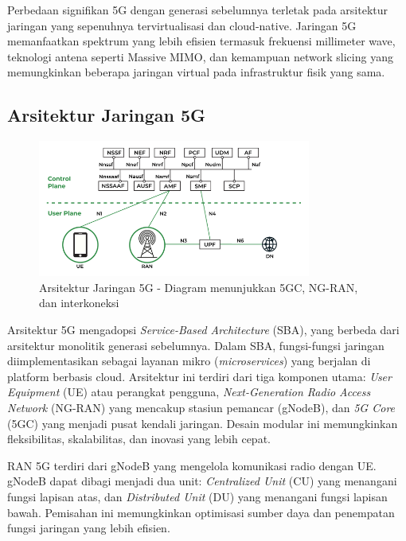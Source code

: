 Perbedaan signifikan 5G dengan generasi sebelumnya terletak pada arsitektur jaringan yang sepenuhnya tervirtualisasi dan cloud-native. Jaringan 5G memanfaatkan spektrum yang lebih efisien termasuk frekuensi millimeter wave, teknologi antena seperti Massive MIMO, dan kemampuan network slicing yang memungkinkan beberapa jaringan virtual pada infrastruktur fisik yang sama.

\subsection{Arsitektur Jaringan 5G}

\begin{figure}[htbp]
    \centering
    \includegraphics[width=0.8\textwidth]{assets/pics/bab3_7.png}
    \caption{Arsitektur Jaringan 5G - Diagram menunjukkan 5GC, NG-RAN, dan interkoneksi}
    \label{fig:5g_architecture}
\end{figure}

Arsitektur 5G mengadopsi \textit{Service-Based Architecture} (SBA), yang berbeda dari arsitektur monolitik generasi sebelumnya. Dalam SBA, fungsi-fungsi jaringan diimplementasikan sebagai layanan mikro (\textit{microservices}) yang berjalan di platform berbasis cloud. Arsitektur ini terdiri dari tiga komponen utama: \textit{User Equipment} (UE) atau perangkat pengguna, \textit{Next-Generation Radio Access Network} (NG-RAN) yang mencakup stasiun pemancar (gNodeB), dan \textit{5G Core} (5GC) yang menjadi pusat kendali jaringan. Desain modular ini memungkinkan fleksibilitas, skalabilitas, dan inovasi yang lebih cepat.

RAN 5G terdiri dari gNodeB yang mengelola komunikasi radio dengan UE. gNodeB dapat dibagi menjadi dua unit: \textit{Centralized Unit} (CU) yang menangani fungsi lapisan atas, dan \textit{Distributed Unit} (DU) yang menangani fungsi lapisan bawah. Pemisahan ini memungkinkan optimisasi sumber daya dan penempatan fungsi jaringan yang lebih efisien.

